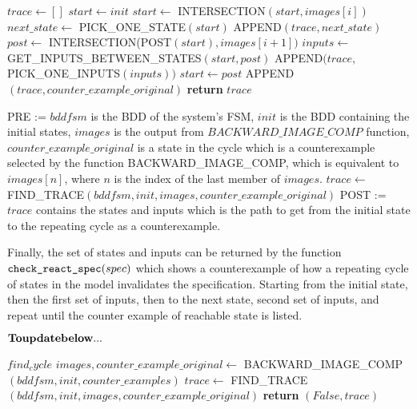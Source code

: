 \documentclass{article}
\begin{document}
\begin{algorithmic}[1]
    \State $trace \leftarrow []$
    \State $start \leftarrow init$
     
        \State $start \leftarrow$ INTERSECTION$(start, images[i])$
        \State $next\_state \leftarrow$ PICK\_ONE\_STATE$(start)$
        \State APPEND$(trace, next\_state)$
        \State $post \leftarrow$ INTERSECTION(POST$(start), images[i+1])$
        \State $inputs \leftarrow$ GET\_INPUTS\_BETWEEN\_STATES$(start, post)$
        \State APPEND$(trace,$ PICK\_ONE\_INPUTS$(inputs))$
        \State $start \leftarrow post$
    \EndFor
    \State APPEND$(trace, counter\_example\_original)$
    \State \textbf{return }$trace$
\EndFunction
\item[]
\State PRE := $bddfsm$ is the BDD of the system's FSM, $init$ is the BDD containing the initial states, $images$ is the output from $BACKWARD\_IMAGE\_COMP$ function, $counter\_example\_original$ is a state in the cycle which is a counterexample selected by the function BACKWARD\_IMAGE\_COMP, which is equivalent to $images[n]$, where $n$ is the index of the last member of $images$.
\State $trace\leftarrow$ FIND\_TRACE$(bddfsm, init, images, counter\_example\_original)$
\State POST := $trace$ contains the states and inputs which is the path to get from the initial state to the repeating cycle as a counterexample.
\end{algorithmic}

\medskip

Finally, the set of states and inputs can be returned by the function $\verb|check_react_spec|(spec)$ which shows a counterexample of how a repeating cycle of states in the model invalidates the specification. Starting from the initial state, then the first set of inputs, then to the next state, second set of inputs, and repeat until the counter example of reachable state is listed.

\medskip

$\bf{To update below...}$

\begin{algorithmic}[1]
    \State $find_cycle$
    \State $images,counter\_example\_original \leftarrow$ \newline
            \hspace*{5em}BACKWARD\_IMAGE\_COMP$(bddfsm, init, counter\_examples)$
    \State $trace \leftarrow$ \newline
            \hspace*{5em}FIND\_TRACE$(bddfsm, init, images, counter\_example\_original)$
    \State \textbf{return }$(False, trace)$
\EndIf
\end{algorithmic}
\end{document}
